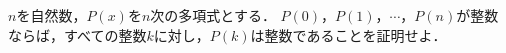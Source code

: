 \documentclass[../../main.tex]{subfiles}
\begin{document}
$n$を自然数，$P(x)$を$n$次の多項式とする．
$P(0)$，$P(1)$，$\cdots$，$P(n)$が整数ならば，すべての整数$k$に対し，$P(k)$は整数であることを証明せよ．
\end{document}
